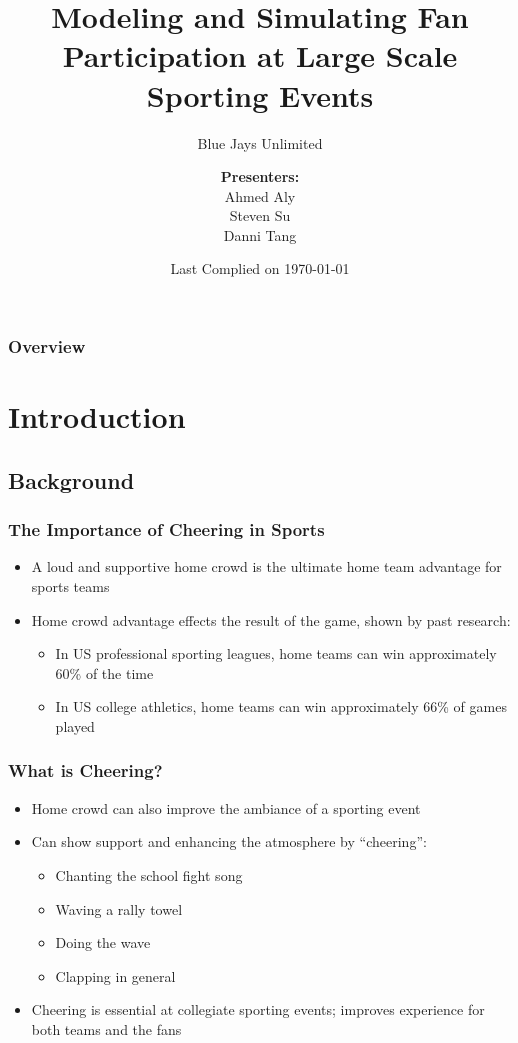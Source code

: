 \documentclass[compress,handout,10pt]{beamer}
\title{{\LARGE Modeling and Simulating Fan Participation at Large Scale Sporting Events\newline} }
\subtitle{{\large Blue Jays Unlimited} }
\author{ 
    {\bf{Presenters:}}\\ 
Ahmed Aly\\
Steven Su \\
Danni Tang\\ 
    \vspace{5pt}
}
\institute{JHU AMS 550.400 Fall 2012}
\date{Last Complied on \today}
\let\olditem\item
\renewcommand{\item}{\setlength{\itemsep}{0.5\baselineskip}\olditem}
\begin{document}
\begin{frame}[plain]
	\titlepage
\end{frame}

\begin{frame}
	\frametitle{Overview}
{\small \tableofcontents}
\end{frame}

\section{Introduction}

\subsection{Background}

\begin{frame}
	\frametitle{The Importance of Cheering in Sports}
		\begin {itemize}
			\item A loud and supportive home crowd is the ultimate home team advantage for sports teams
			\item Home crowd advantage effects the result of the game, shown by past research:
			\begin{itemize}
				\item In US professional sporting leagues, home teams can win approximately 60\% of the time \cite{Jamieson_2010}
				\item In US college athletics, home teams can win approximately 66\% of games played \cite{Snyder_1985}
			\end{itemize}
		\end {itemize}
\end{frame}

\begin{frame}
	\frametitle{What is Cheering?}
		\begin{itemize}
		\item Home crowd can also improve the ambiance of a sporting event
		\item Can show support and enhancing the atmosphere by ``cheering'':
		\begin{itemize}
			\item Chanting the school fight song
			\item Waving a rally towel
			\item Doing the wave
			\item Clapping in general
		\end{itemize}
	\item Cheering is essential at collegiate sporting events; improves experience for both teams and the fans
	\end{itemize}
\end{frame}
\end{document}

